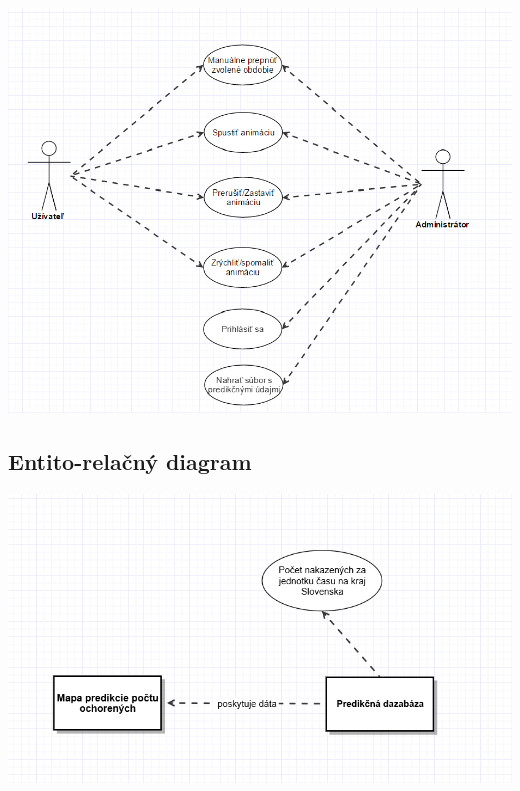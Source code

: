 \documentclass[12pt,a4paper]{report}
\begin{document}
\includegraphics[scale=0.6]{use_case_diagram}

\subsection[Entito-relačný diagram]{\rmfamily\bfseries
	Entito-relačný diagram}

\includegraphics[scale=0.6]{E-R_diagram}
\end{document}
